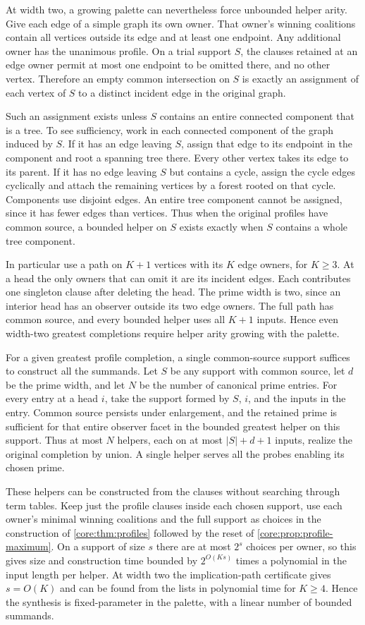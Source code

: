 At width two, a growing palette can nevertheless force
unbounded helper arity. Give each edge of a simple graph
its own owner. That owner's winning coalitions contain
all vertices outside its edge and at least one endpoint.
Any additional owner has the unanimous profile. On a
trial support $S$, the clauses retained at an edge owner
permit at most one endpoint to be omitted there, and no
other vertex. Therefore an empty common intersection on
$S$ is exactly an assignment of each vertex of $S$ to a
distinct incident edge in the original graph.

Such an assignment exists unless $S$ contains an entire
connected component that is a tree. To see sufficiency,
work in each connected component of the graph induced by
$S$. If it has an edge leaving $S$, assign that edge to its
endpoint in the component and root a spanning tree there.
Every other vertex takes its edge to its parent. If it
has no edge leaving $S$ but contains a cycle, assign the
cycle edges cyclically and attach the remaining vertices
by a forest rooted on that cycle. Components use disjoint
edges. An entire tree component cannot be assigned,
since it has fewer edges than vertices. Thus when the
original profiles have common source, a bounded helper
on $S$ exists exactly when $S$ contains a whole tree
component.

In particular use a path on $K+1$ vertices with its $K$
edge owners, for $K\ge3$. At a head the only owners that
can omit it are its incident edges. Each contributes one
singleton clause after deleting the head. The prime width
is two, since an interior head has an observer outside its
two edge owners. The full path has common source, and
every bounded helper uses all $K+1$ inputs. Hence even
width-two greatest completions require helper arity growing
with the palette.

For a given greatest profile completion, a single
common-source support suffices to construct all the
summands. Let $S$ be any support with common source,
let $d$ be the prime width, and let $N$ be the number
of canonical prime entries. For every entry at a head
$i$, take the support formed by $S$, $i$, and the
inputs in the entry. Common source persists under
enlargement, and the retained prime is sufficient
for that entire observer facet in the bounded greatest
helper on this support. Thus at most $N$ helpers,
each on at most $|S|+d+1$ inputs, realize the original
completion by union. A single helper serves all the
probes enabling its chosen prime.

These helpers can be constructed from the clauses
without searching through term tables. Keep just
the profile clauses inside each chosen support,
use each owner's minimal winning coalitions and the
full support as choices in the construction of
\cref{core:thm:profiles} followed by the reset of
\cref{core:prop:profile-maximum}. On a support of
size $s$ there are at most $2^s$ choices per owner,
so this gives size and construction time bounded
by $2^{O(Ks)}$ times a polynomial in the input length
per helper. At width two the implication-path
certificate gives $s=O(K)$ and can be found from
the lists in polynomial time for $K\ge4$. Hence
the synthesis is fixed-parameter in the palette,
with a linear number of bounded summands.


